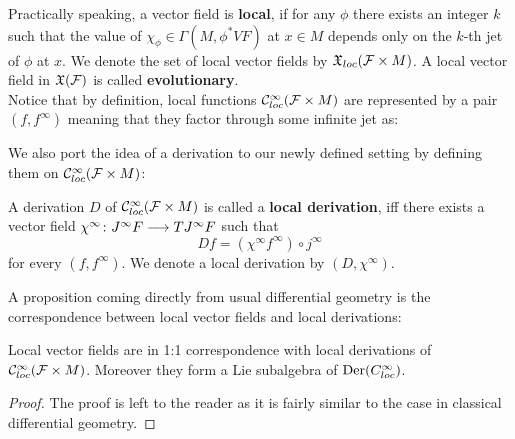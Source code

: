 Practically speaking, a vector field is \textbf{local}, if for any $\phi$ there exists an integer $k$ such that the value of $\chi_\phi \in \Gamma(M, \phi^* VF)$ at $x\in M$ depends only on the $k$-th jet of $\phi$ at $x$. We denote the set of local vector fields by $\mathfrak{X}_{loc}({\mathcal{F}} \times M)$. A local vector field in $\mathfrak{X}({\mathcal{F}})$ is called \textbf{evolutionary}.\\

Notice that by definition, local functions $\mathcal{C}^{\infty}_{loc}({\mathcal{F}} \times M)$ are represented by a pair $(f, f^\infty)$ meaning that they factor through some infinite jet as:

\begin{center}
\end{center}

We also port the idea of a derivation to our newly defined setting by defining them on $\mathcal{C}^{\infty}_{loc}({\mathcal{F}} \times M)$:

\begin{definition}
  A derivation $D$ of $\mathcal{C}^{\infty}_{loc}({\mathcal{F}} \times M)$ is called a \textbf{local derivation}, iff there exists a vector field $\chi^\infty \colon J^\infty F \longrightarrow TJ^\infty F$ such that
  $$ Df = (\chi^\infty f^\infty) \circ j^\infty $$
  for every $(f, f^\infty)$. We denote a local derivation by $(D, \chi^\infty)$.
\end{definition}

A proposition coming directly from usual differential geometry is the correspondence between local vector fields and local derivations:

\begin{prop}
  Local vector fields are in 1:1 correspondence with local derivations of $\mathcal{C}^{\infty}_{loc}({\mathcal{F}} \times M)$. Moreover they form a Lie subalgebra of $\operatorname{Der}(C^\infty_{loc})$.
\begin{proof}
  The proof is left to the reader as it is fairly similar to the case in classical differential geometry.
\end{proof}
\end{prop}

